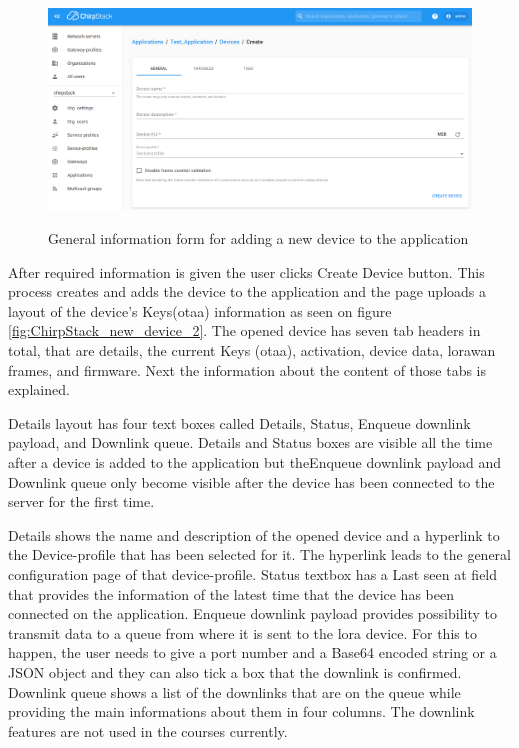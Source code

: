 \begin{figure}[ht]
  \centering
  {\includegraphics[width=\textwidth]{illustration/ChirpStack_new_device.png}}
  \caption{General information form for adding a new device to the application}
  \label{fig:ChirpStack_new_device}
\end{figure}

After required information is given the user clicks Create Device button.
This process creates and adds the device to the application and the page uploads a layout of the device's Keys(\gls{otaa}) information as seen on figure \ref{fig:ChirpStack_new_device_2}. 
The opened device has seven tab headers in total, that are details, the current Keys (\gls{otaa}), activation, device data, \gls{lorawan} frames, and firmware.
Next the information about the content of those tabs is explained.

Details layout has four text boxes called Details, Status, Enqueue downlink payload, and Downlink queue.
Details and Status boxes are visible all the time after a device is added to the application but theEnqueue downlink payload and Downlink queue only become visible after the device has been connected to the server for the first time.

Details shows the name and description of the opened device and a hyperlink to the Device-profile that has been selected for it.
The hyperlink leads to the general configuration page of that device-profile.
Status textbox has a Last seen at field that provides the information of the latest time that the device has been connected on the application.
Enqueue downlink payload provides possibility to transmit data to a queue from where it is sent to the \gls{lora} device. For this to happen, the user needs to give a port number and a Base64 encoded string or a JSON object and they can also tick a box  that the downlink is confirmed.
Downlink queue shows  a list of the downlinks that are on the queue while providing the main informations about them in four columns.
The downlink features are not used in the courses currently.

